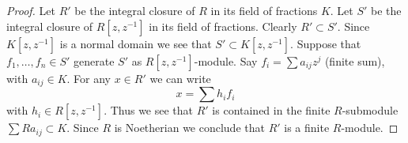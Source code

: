 \documentclass[10pt,a4paper]{amsart}
\theoremstyle{plain}
\theoremstyle{definition}
\theoremstyle{remark}
\numberwithin{equation}{subsection}
\begin{document}
\begin{proof}
Let $R'$ be the integral closure of $R$ in its field of fractions $K$.
Let $S'$ be the integral closure of $R[z, z^{-1}]$ in its field of fractions.
Clearly $R' \subset S'$.
Since $K[z, z^{-1}]$ is a normal domain we see that $S' \subset K[z, z^{-1}]$.
Suppose that $f_1, \ldots, f_n \in S'$ generate $S'$ as $R[z, z^{-1}]$-module.
Say $f_i = \sum a_{ij}z^j$ (finite sum), with $a_{ij} \in K$.
For any $x \in R'$ we can write
$$
x = \sum h_i f_i
$$
with $h_i \in R[z, z^{-1}]$. Thus we see that $R'$ is contained in the
finite $R$-submodule $\sum Ra_{ij} \subset K$. Since $R$ is Noetherian
we conclude that $R'$ is a finite $R$-module.
\end{proof}
\end{document}

